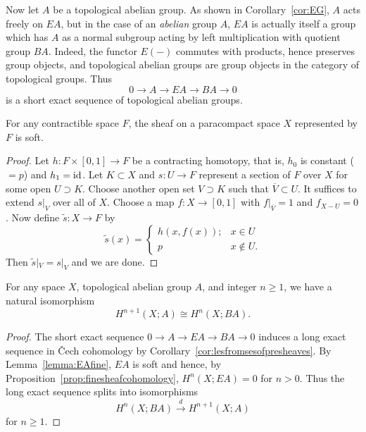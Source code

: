 \documentclass[a4paper,openany]{scrbook}
\begin{document}
Now let $A$ be a topological abelian group. As shown in Corollary~\ref{cor:EG}, $A$ acts freely on $EA$, but in the case of an \emph{abelian} group $A$, $EA$ is actually itself a group which has $A$ as a normal subgroup acting by left multiplication with quotient group $BA$. Indeed, the functor $E(-)$ commutes with products, hence preserves group objects, and topological abelian groups are group objects in the category of topological groups. Thus
\[
0 \to A \to EA \to BA \to 0
\]
is a short exact sequence of topological abelian groups.

\begin{lemma}\label{lemma:EAfine}
For any contractible space $F$, the sheaf on a paracompact space $X$ represented by $F$ is soft.
\end{lemma}
\begin{proof}
Let $h\colon F \times [0,1] \to F$ be a contracting homotopy, that is, $h_0$ is constant ($=p$) and $h_1=\operatorname{id}$. Let $K \subset X$ and $s\colon U \to F$ represent a section of $F$ over $X$ for some open $U \supset K$. Choose another open set $V \supset K$ such that $\overline V \subset U$. It suffices to extend $s|_V$ over all of $X$. Choose a map $f\colon X \to [0,1]$ with $f|_{\overline V} = 1$ and $f_{X-U}=0$. Now define $\tilde s\colon X \to F$ by
\[
\tilde s(x) = \begin{cases} h(x,f(x)); & x \in U\\
p\; & x \not\in U.\end{cases}
\]
Then $\tilde s|_V = s|_V$ and we are done.
\end{proof}

\begin{corollary} \label{cor:cechdimensionshift}
For any space $X$, topological abelian group $A$, and integer $n\geq 1$, we have a natural isomorphism
\[
H^{n+1}(X;A) \cong H^n(X;BA).
\]
\end{corollary}
\begin{proof}
The short exact sequence $0 \to A \to EA \to BA \to 0$ induces a long exact sequence in \v Cech cohomology by Corollary~\ref{cor:lesfromsesofpresheaves}. By Lemma~\ref{lemma:EAfine}, $EA$ is soft and hence, by Proposition~\ref{prop:finesheafcohomology}, $H^n(X;EA)=0$ for $n>0$. Thus the long exact sequence splits into isomorphisms
\[
H^n(X;BA) \xrightarrow{d} H^{n+1}(X;A)
\]
for $n \geq 1$.
\end{proof}
\end{document}
